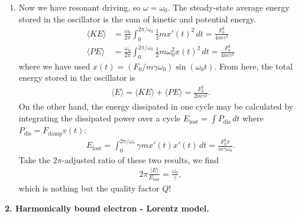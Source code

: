 \documentclass{article}
\theoremstyle{definition}
\newcommand{\f}[2]{\frac{#1}{#2}}
\begin{document}
\begin{enumerate}[label= \alph*)]
	
	\item Now we have resonant driving, so $\omega = \omega_0$. The steady-state average energy stored in the oscillator is the sum of kinetic and potential energy. 
	\begin{align*}
	\langle KE\rangle &= \f{\omega_0}{2\pi} \int_0^{2\pi/\omega_0} \f{1}{2}m x'(t)^2\,dt=   \f{F_0^2 }{4m\gamma^2}\\
	\langle PE \rangle &= \f{\omega_0}{2\pi}\int_0^{2\pi/\omega_0} \f{1}{2}m \omega_0^2 x(t)^2\,dt  = \f{F_0^2}{4m\gamma^2}
	\end{align*}
	where we have used $x(t) = (F_0/m\gamma \omega_0) \sin(\omega_0 t)$. From here, the total energy stored in the oscillator is 
	\begin{align*}
	\langle E \rangle = \langle KE \rangle + \langle PE \rangle = \f{F_0^2}{2m\gamma^2}.
	\end{align*}
	On the other hand, the energy dissipated in one cycle may be calculated by integrating the dissipated power over a cycle $E_\text{lost} = \int P_\text{dis}\,dt$ where $P_\text{dis} = F_\text{damp} v(t)$: 
	\begin{align*}
	E_\text{lost} = \int_0^{2\pi/\omega_0} \gamma m x'(t) x'(t)\,dt = \f{F_0^2 \pi}{m\gamma \omega_0}.
	\end{align*}
	Take the $2\pi$-adjusted ratio of these two results, we find 
	\begin{align*}
	2\pi \f{\langle E \rangle}{E_\text{lost}} = \f{\omega_0}{\gamma},
	\end{align*}
	which is nothing but the quality factor $Q$!
	
\end{enumerate} 



\noindent \textbf{2. Harmonically bound electron - Lorentz model.}
\end{document}
